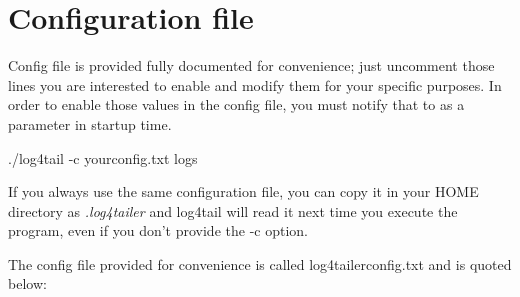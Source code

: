 \section{Configuration file}
Config file is provided fully documented for convenience; just uncomment those
lines you are interested to enable and modify them for your specific purposes.
In order to enable those values in the config file, you must notify that to
\logftailer{} as a parameter in startup time.

\begin{cmd}
 ./log4tail -c yourconfig.txt logs
\end{cmd}
If you always use the same configuration file, you can copy it in your HOME
directory as \emph{.log4tailer} and log4tail will read it next time you execute
the program, even if you don't provide the -c option.

The config file provided for convenience is called log4tailerconfig.txt and is quoted below:

